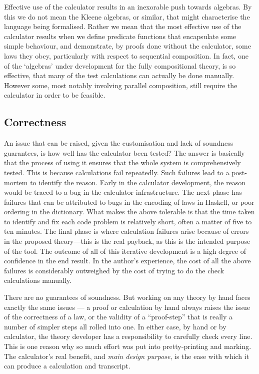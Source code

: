     Effective use of the calculator results in an inexorable
    push towards algebras. By this we do not mean the Kleene algebras,
    or similar, that might characterise the language being formalised.
    Rather we mean that the most effective use of the calculator results
    when we define predicate functions that encapsulate some simple
    behaviour, and demonstrate, by proofs done without the calculator,
    some laws they obey,
    particularly with respect to sequential composition.
    In fact, one of the `algebras' under development for the fully
    compositional theory, is so effective,
    that many of the test calculations
    can actually be done manually.
    However some, most notably involving parallel composition,
    still require the calculator in order to be feasible.

\subsection{Correctness}

    An issue that can be raised,
    given the customisation and lack of soundness guarantees,
    is how well has the calculator been tested?
    The answer is basically that the process of using it ensures
    that the whole system is comprehensively tested.
    This is because calculations fail repeatedly.
    Such failures lead to a post-mortem to identify the reason.
    Early in the calculator development,
    the reason would be traced to a bug in the calculator infrastructure.
    The next phase has failures that can be attributed
    to bugs in the encoding of laws in Haskell,
    or poor ordering in the dictionary.
    What makes the above tolerable is that the time taken to identify
    and fix each code problem is relatively short,
    often a matter of five to ten minutes.
    The final phase is where calculation failures arise because of errors
    in the proposed theory---this is the real payback,
    as this is the intended purpose of the tool.
    The outcome of all of this iterative development
    is a high degree of confidence in the end result.
    In the author's experience,
    the cost of all the above failures
    is considerably outweighed by the cost of
    trying to do the check calculations manually.

There are no guarantees of soundness.
But working on any theory by hand faces exactly the same issues
--- a proof or calculation by hand always raises the issue
of the correctness of a law, or the validity of a ``proof-step''
that is really a number of simpler steps all rolled into one.
In either case, by hand or by calculator,
the theory developer has a responsibility to carefully check every line.
This is one reason why so much effort was put into pretty-printing
and marking.
The calculator's real benefit, and\emph{ main design purpose},
is the ease with which
it can produce a calculation and transcript.


